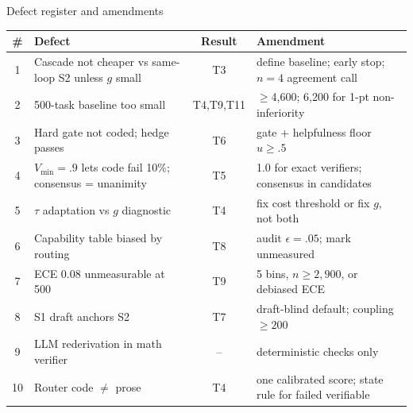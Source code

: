 \documentclass[aspectratio=169,10pt]{beamer}
\begin{document}
\begin{frame}{Defect register and amendments}
\scriptsize
\begin{tabular}{@{}c p{4.6cm} c p{6.2cm}@{}}
\toprule
\# & Defect & Result & Amendment\\\midrule
1 & Cascade not cheaper vs same-loop S2 unless $g$ small & T3 & define baseline; early stop; $n{=}4$ agreement call\\
2 & 500-task baseline too small & T4,T9,T11 & $\ge$4,600; 6,200 for 1-pt non-inferiority\\
3 & Hard gate not coded; hedge passes & T6 & gate + helpfulness floor $u\ge.5$\\
4 & $V_{\min}{=}.9$ lets code fail 10\%; consensus = unanimity & T5 & 1.0 for exact verifiers; consensus in candidates\\
5 & $\tau$ adaptation vs $g$ diagnostic & T4 & fix cost threshold or fix $g$, not both\\
6 & Capability table biased by routing & T8 & audit $\epsilon{=}.05$; mark unmeasured\\
7 & ECE 0.08 unmeasurable at 500 & T9 & 5 bins, $n\ge2{,}900$, or debiased ECE\\
8 & S1 draft anchors S2 & T7 & draft-blind default; coupling $\ge200$\\
9 & LLM rederivation in math verifier & -- & deterministic checks only\\
10 & Router code $\ne$ prose & T4 & one calibrated score; state rule for failed verifiable\\\bottomrule
\end{tabular}
\end{frame}
\end{document}

